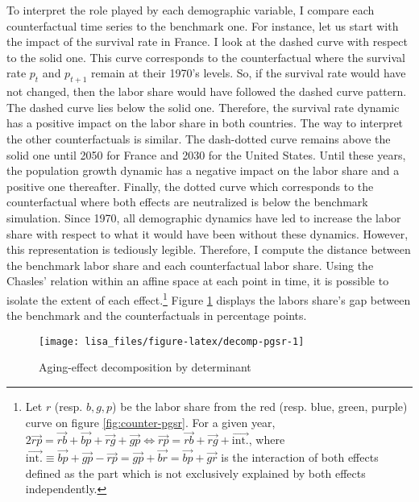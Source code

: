 \documentclass[
]{article}
\begin{document}
To interpret the role played by each demographic variable, I compare each counterfactual time series to the benchmark one. For instance, let us start with the impact of the survival rate in France. I look at the dashed curve with respect to the solid one. This curve corresponds to the counterfactual where the survival rate \(p_t\) and \(p_{t+1}\) remain at their 1970's levels. So, if the survival rate would have not changed, then the labor share would have followed the dashed curve pattern.
The dashed curve lies below the solid one. Therefore, the survival rate dynamic has a positive impact on the labor share in both countries.
The way to interpret the other counterfactuals is similar.
The dash-dotted curve remains above the solid one until 2050 for France and 2030 for the United States. Until these years, the population growth dynamic has a negative impact on the labor share and a positive one thereafter.
Finally, the dotted curve which corresponds to the counterfactual where both effects are neutralized is below the benchmark simulation. Since 1970, all demographic dynamics have led to increase the labor share with respect to what it would have been without these dynamics.
However, this representation is tediously legible. Therefore, I compute the distance between the benchmark labor share and each counterfactual labor share. Using the Chasles' relation within an affine space at each point in time, it is possible to isolate the extent of each effect.\footnote{Let \(r\) (resp. \(b, g, p\)) be the labor share from the red (resp. blue, green, purple) curve on figure \ref{fig:counter-pgsr}. For a given year, \(2\vec{rp} = \vec{rb} + \vec{bp} + \vec{rg} + \vec{gp} \Leftrightarrow \vec{rp} = \vec{rb} + \vec{rg} + \vec{\text{int.}}\), where \(\vec{\text{int.}} \equiv \vec{bp} + \vec{gp} - \vec{rp} = \vec{gp} +\vec{br} = \vec{bp} + \vec{gr}\) is the interaction of both effects defined as the part which is not exclusively explained by both effects independently.} Figure \ref{fig:decomp-pgsr} displays the labors share's gap between the benchmark and the counterfactuals in percentage points.

\begin{figure}[!tb]

{\centering \texttt{[image: lisa\_files/figure-latex/decomp-pgsr-1]} 

}

\caption{Aging-effect decomposition by determinant}\label{fig:decomp-pgsr}
\end{figure}
\end{document}
